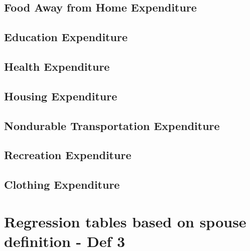 \documentclass[a4paper,landscape]{article}
\begin{document}
\subsection{Food Away from Home Expenditure}

\clearpage

\subsection{Education Expenditure}

\clearpage

\subsection{Health Expenditure}

\clearpage

\subsection{Housing Expenditure}

\clearpage

\subsection{Nondurable Transportation Expenditure}

\clearpage

\subsection{Recreation Expenditure}

\clearpage

\subsection{Clothing Expenditure}

\clearpage





\section{Regression tables based on spouse definition - Def 3}
\end{document}
